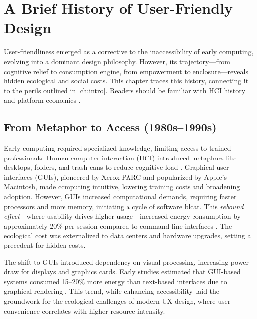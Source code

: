 \documentclass[openany]{book}
\begin{document}
\chapter{A Brief History of User-Friendly Design}
\label{ch:history}

User-friendliness emerged as a corrective to the inaccessibility of early computing, evolving into a dominant design philosophy. However, its trajectory---from cognitive relief to consumption engine, from empowerment to enclosure---reveals hidden ecological and social costs. This chapter traces this history, connecting it to the perils outlined in \cref{ch:intro}. Readers should be familiar with HCI history and platform economics \citep{norman1988,doctorow2022}.

\section{From Metaphor to Access (1980s--1990s)}
\label{sec:history-metaphor}
Early computing required specialized knowledge, limiting access to trained professionals. Human-computer interaction (HCI) introduced metaphors like desktops, folders, and trash cans to reduce cognitive load \citep{norman1988}. Graphical user interfaces (GUIs), pioneered by Xerox PARC and popularized by Apple’s Macintosh, made computing intuitive, lowering training costs and broadening adoption. However, GUIs increased computational demands, requiring faster processors and more memory, initiating a cycle of software bloat. This \emph{rebound effect}---where usability drives higher usage---increased energy consumption by approximately 20\% per session compared to command-line interfaces \citep{extentia2024}. The ecological cost was externalized to data centers and hardware upgrades, setting a precedent for hidden costs.

The shift to GUIs introduced dependency on visual processing, increasing power draw for displays and graphics cards. Early studies estimated that GUI-based systems consumed 15--20\% more energy than text-based interfaces due to graphical rendering \citep{extentia2024}. This trend, while enhancing accessibility, laid the groundwork for the ecological challenges of modern UX design, where user convenience correlates with higher resource intensity.
\end{document}
